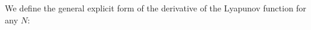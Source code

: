 \documentclass[10pt, a4paper]{amsart}
\theoremstyle{plain}
\theoremstyle{definition}
\theoremstyle{remark}
\numberwithin{equation}{section}
\begin{document}
We define the general explicit form of the derivative of the Lyapunov function for any  $N$:
\end{document}
